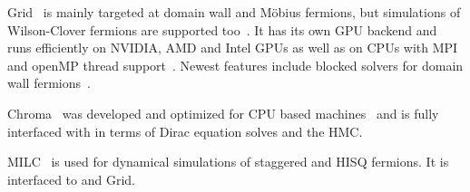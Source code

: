 Grid~\cite{Boyle:2015,github:grid} is mainly targeted at domain wall and Möbius fermions, but simulations of Wilson-Clover fermions are supported too~\cite{Richtmann:2019}.
It has its own GPU backend and runs efficiently on NVIDIA, AMD and Intel GPUs as well as on CPUs with MPI and openMP thread support~\cite{Yamaguchi:2022}.
Newest features include blocked solvers for domain wall fermions~\cite{Boyle:2024pio}.

Chroma~\cite{Edwards:2004sx} was developed and optimized for CPU based machines~\cite{mcclendon2001optimized} and is fully interfaced with \quda in terms of Dirac equation solves and the HMC.

MILC~\cite{github:milc,online:milc} is used for dynamical simulations of staggered and HISQ fermions.
It is interfaced to \quda and Grid.





